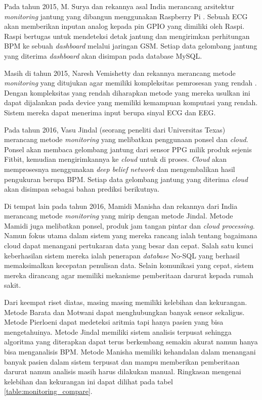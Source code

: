 Pada tahun 2015, M. Surya dan rekannya asal India merancang arsitektur \textit{monitoring} jantung yang dibangun menggunakan Raspberry Pi \cite{surya}. Sebuah ECG akan memberikan inputan analog kepada pin GPIO yang dimiliki oleh Raspi. Raspi bertugas untuk mendeteksi detak jantung dan mengirimkan perhitungan BPM ke sebuah \textit{dashboard} melalui jaringan GSM. Setiap data gelombang jantung yang diterima \textit{dashboard} akan disimpan pada database MySQL.

Masih di tahun 2015, Naresh Vemishetty dan rekannya merancang metode \textit{monitoring} yang ditujukan agar memiliki kompleksitas pemrosesan yang rendah \cite{naresh}. Dengan kompleksitas yang rendah diharapkan metode yang mereka usulkan ini dapat dijalankan pada device yang memiliki kemampuan komputasi yang rendah. Sistem mereka dapat menerima input berupa sinyal ECG dan EEG.

Pada tahun 2016, Vasu Jindal (seorang peneliti dari Universitas Texas) merancang metode \textit{monitoring} yang melibatkan penggunaan ponsel dan \textit{cloud}\cite{vasu_jindal}. Ponsel akan membaca gelombang jantung dari sensor PPG milik produk sejenis Fitbit, kemudian mengirimkannya ke \textit{cloud} untuk di proses. \textit{Cloud} akan memprosesnya menggunakan \textit{deep belief network} dan mengembalikan hasil pengukuran berupa BPM. Setiap data gelombang jantung yang diterima \textit{cloud} akan disimpan sebagai bahan prediksi berikutnya.

Di tempat lain pada tahun 2016, Mamidi Manisha dan rekannya dari India merancang metode \textit{monitoring} yang mirip dengan metode Jindal. Metode Mamidi juga melibatkan ponsel, produk jam tangan pintar dan \textit{cloud processing}\cite{mamidi}. Namun fokus utama dalam sistem yang mereka rancang ialah tentang bagaimana cloud dapat menangani pertukaran data yang besar dan cepat. Salah satu kunci keberhasilan sistem mereka ialah penerapan \textit{database} No-SQL yang berhasil memaksimalkan kecepatan penulisan data. Selain komunikasi yang cepat, sistem mereka dirancang agar memiliki mekanisme pemberitaan darurat kepada rumah sakit.

Dari keempat riset diatas, masing masing memiliki kelebihan dan kekurangan. Metode Barata dan Motwani dapat menghubungkan banyak sensor sekaligus. Metode Pierloeni dapat medeteksi aritmia tapi hanya pasien yang bisa mengetahuinya. Metode Jindal memiliki sistem analisis terpusat sehingga algoritma yang diterapkan dapat terus berkembang semakin akurat namun hanya bisa menganalisis BPM. Metode Manisha memiliki kehandalan dalam menangani banyak pasien dalam sistem terpusat dan mampu memberikan pemberitaan darurat namun analisis masih harus dilakukan manual. Ringkasan mengenai kelebihan dan kekurangan ini dapat dilihat pada tabel \ref{table:monitoring_compare}.

